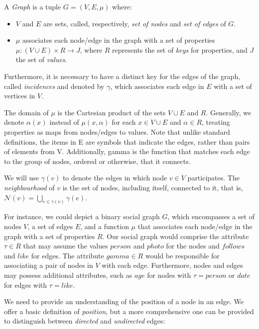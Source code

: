 \documentclass{article}%
\begin{document}
\begin{definition}
A \emph{Graph} is a tuple $ G = (V, E, \mu) $ where:
\begin{itemize}
\item $ V $ and $ E $ are sets, called, respectively, \emph{set of nodes} and \emph{set of edges} of $ G $.
\item $ \mu $ associates each node/edge in the graph with a set of properties $ \mu: (V \cup E) \times R \rightarrow J $, where $ R $ represents the set of \emph{keys} for  properties, and $ J $ the set of \emph{values}. 
\end{itemize} 

Furthermore, it is necessary to have a distinct key for the edges of the graph, called \emph{incidences} and denoted by $\gamma $, which associates each edge in $E$ with a set of vertices in $V$.
\end{definition}
\medskip
The domain of $ \mu $ is the Cartesian product of the sets $V \cup E$ and $ R $. Generally, we denote $\alpha(x)$ instead of $\mu(x,\alpha)$ for each $x\in V\cup E$ and $\alpha \in R$, treating properties as maps from nodes/edges to values. Note that unlike standard definitions, the items in E are symbols that indicate the edges, rather than pairs of elements from V. Additionally, gamma is the function that matches each edge to the group of nodes, ordered or otherwise, that it connects. 

We will use $\gamma(v)$ to denote the edges in which node $v\in V$ participates. The \emph{neighbourhood} of $ v $ is the set of nodes, including itself, connected to it, that is, $ \mathcal{N}(v) = \bigcup_{e \in \gamma (v)} \gamma (e) $. 

For instance, we could depict a binary social graph $G$, which encompasses a set of nodes $V$, a set of edges $E$, and a function $\mu$ that associates each node/edge in the graph with a set of properties $R$. Our social graph would comprise the attribute $\tau \in R$ that may assume the values $person$ and $photo$ for the nodes and $follows$ and $like$ for edges. The attribute $gamma \in R$ would be responsible for associating a pair of nodes in $V$ with each edge. Furthermore, nodes and edges may possess additional attributes, such as $age$ for nodes with $\tau = person$ or $date$ for edges with $\tau = like$.

We need to provide an understanding of the position of a node in an edge. We offer a basic definition of \textit{position}, but a more comprehensive one can be provided to distinguish between \textit{directed} and \textit{undirected} edges:
\end{document}
